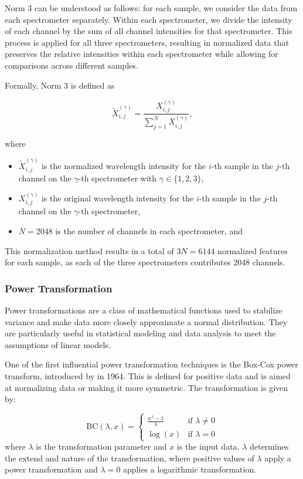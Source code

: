 Norm 3 can be understood as follows: for each sample, we consider the data from each spectrometer separately. Within each spectrometer, we divide the intensity of each channel by the sum of all channel intensities for that spectrometer. This process is applied for all three spectrometers, resulting in normalized data that preserves the relative intensities within each spectrometer while allowing for comparisons across different samples.

Formally, Norm 3 is defined as

\begin{equation}
	\tilde{X}_{i,j}^{(\gamma)} = \frac{X_{i,j}^{(\gamma)}}{\sum_{j=1}^{N} X_{i,j}^{(\gamma)}},
\end{equation}

where

\begin{itemize}
	\item $\tilde{X}_{i,j}^{(\gamma)}$ is the normalized wavelength intensity for the $i$-th sample in the $j$-th channel on the $\gamma$-th spectrometer with $\gamma \in \{1, 2, 3\}$,
	\item $X_{i,j}^{(\gamma)}$ is the original wavelength intensity for the $i$-th sample in the $j$-th channel on the $\gamma$-th spectrometer,
	\item $N = 2048$ is the number of channels in each spectrometer, and
\end{itemize}

This normalization method results in a total of $3N = 6144$ normalized features for each sample, as each of the three spectrometers contributes 2048 channels.

\subsubsection{Power Transformation}
Power transformations are a class of mathematical functions used to stabilize variance and make data more closely approximate a normal distribution.
They are particularly useful in statistical modeling and data analysis to meet the assumptions of linear models.

One of the first influential power transformation techniques is the Box-Cox power transform, introduced by \citet{BoxAndCox} in 1964.
This is defined for positive data and is aimed at normalizing data or making it more symmetric. The transformation is given by:

$$
\text{BC}(\lambda, x) =
\begin{cases}
\frac{x^\lambda - 1}{\lambda} & \text{if } \lambda \neq 0 \\
\log(x) & \text{if } \lambda = 0
\end{cases}
$$
where $ \lambda $ is the transformation parameter and $x$ is the input data.
$\lambda$ determines the extend and nature of the transformation, where positive values of $\lambda$ apply a power transformation and $\lambda = 0$ applies a logarithmic transformation.


